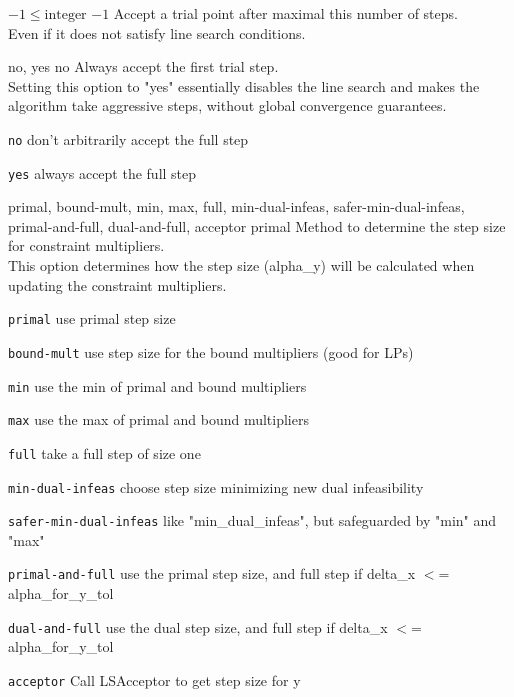 %
{$-1\leq\textrm{integer}$}%
{$-1$}%
{Accept a trial point after maximal this number of steps.\\
Even if it does not satisfy line search conditions.}%
{}

%
{no, yes}%
{no}%
{Always accept the first trial step.\\
Setting this option to "yes" essentially disables the line search and makes the algorithm take aggressive steps, without global convergence guarantees.}%
{\begin{list}{}{
\setlength{\parsep}{0em}
\setlength{\leftmargin}{5ex}
\setlength{\labelwidth}{2ex}
\setlength{\itemindent}{0ex}
\setlength{\topsep}{0pt}}
\item[\texttt{no}] don't arbitrarily accept the full step
\item[\texttt{yes}] always accept the full step
\end{list}
}

%
{primal, bound-mult, min, max, full, min-dual-infeas, safer-min-dual-infeas, primal-and-full, dual-and-full, acceptor}%
{primal}%
{Method to determine the step size for constraint multipliers.\\
This option determines how the step size (alpha\_y) will be calculated when updating the constraint multipliers.}%
{\begin{list}{}{
\setlength{\parsep}{0em}
\setlength{\leftmargin}{5ex}
\setlength{\labelwidth}{2ex}
\setlength{\itemindent}{0ex}
\setlength{\topsep}{0pt}}
\item[\texttt{primal}] use primal step size
\item[\texttt{bound-mult}] use step size for the bound multipliers (good for LPs)
\item[\texttt{min}] use the min of primal and bound multipliers
\item[\texttt{max}] use the max of primal and bound multipliers
\item[\texttt{full}] take a full step of size one
\item[\texttt{min-dual-infeas}] choose step size minimizing new dual infeasibility
\item[\texttt{safer-min-dual-infeas}] like "min\_dual\_infeas", but safeguarded by "min" and "max"
\item[\texttt{primal-and-full}] use the primal step size, and full step if delta\_x $<$= alpha\_for\_y\_tol
\item[\texttt{dual-and-full}] use the dual step size, and full step if delta\_x $<$= alpha\_for\_y\_tol
\item[\texttt{acceptor}] Call LSAcceptor to get step size for y
\end{list}
}

